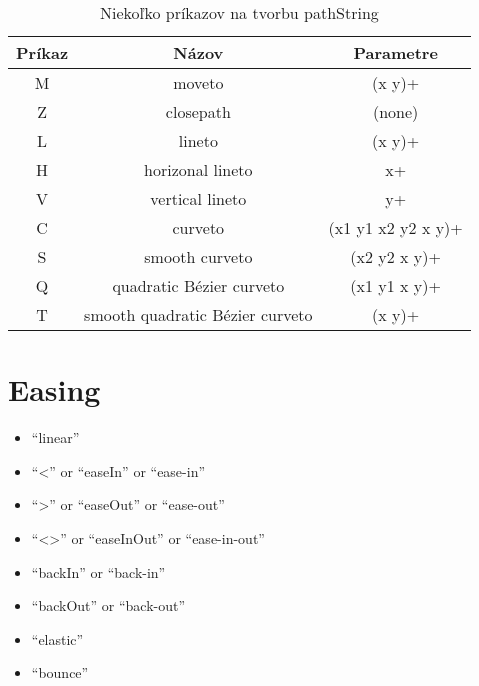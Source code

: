 \begin{center}
\begin{table}
\begin{center}
	\begin{tabular}{|c|c|c|}
	\hline \textbf{Príkaz} & \textbf{Názov} & \textbf{Parametre} \\
	\hline M & moveto & (x y)+ \\ 
	\hline Z & closepath & (none) \\ 
	\hline L & lineto & (x y)+ \\ 
	\hline H & horizonal lineto & x+ \\ 
	\hline V & vertical lineto & y+ \\ 
	\hline C & curveto & (x1 y1 x2 y2 x y)+ \\ 
	\hline S & smooth curveto & (x2 y2 x y)+ \\ 
	\hline Q & quadratic Bézier curveto & (x1 y1 x y)+ \\ 
	\hline T & smooth quadratic Bézier curveto & (x y)+ \\ 
	\hline 
\end{tabular} 
\end{center}
\caption{Niekoľko príkazov na tvorbu pathString}
\label{prikazyPath}
\end{table}
	\end{center}
		












\section{Easing}

\begin{itemize}
\item 	“linear”
\item 	“<” or “easeIn” or “ease-in”
\item 	“>” or “easeOut” or “ease-out”
\item 	“<>” or “easeInOut” or “ease-in-out”
\item 	“backIn” or “back-in”
\item 	“backOut” or “back-out”
\item 	“elastic”
\item 	“bounce”
\end{itemize}



